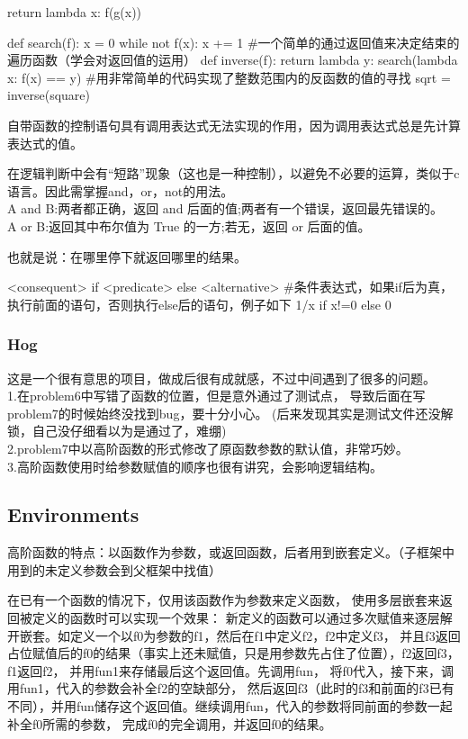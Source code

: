 \documentclass{ctexart}
\begin{document}
return lambda x: f(g(x))
\begin{python}
    def search(f):
        x = 0
        while not f(x):
            x += 1
#一个简单的通过返回值来决定结束的遍历函数（学会对返回值的运用）
    def inverse(f):
        return lambda y: search(lambda x: f(x) == y)
#用非常简单的代码实现了整数范围内的反函数的值的寻找
    sqrt = inverse(square)
\end{python}

自带函数的控制语句具有调用表达式无法实现的作用，因为调用表达式总是先计算表达式的值。

在逻辑判断中会有“短路”现象（这也是一种控制），以避免不必要的运算，类似于c语言。因此需掌握and，or，not的用法。
\\A and B:两者都正确，返回 and 后面的值;两者有一个错误，返回最先错误的。
\\A or B:返回其中布尔值为 True 的一方;若无，返回 or 后面的值。

也就是说：在哪里停下就返回哪里的结果。

\begin{python}
    <consequent> if <predicate> else <alternative>
    #条件表达式，如果if后为真，执行前面的语句，否则执行else后的语句，例子如下
    1/x if x!=0 else 0
\end{python}
\subsubsection{Hog}
这是一个很有意思的项目，做成后很有成就感，不过中间遇到了很多的问题。
\\1.在problem6中写错了函数的位置，但是意外通过了测试点，
导致后面在写problem7的时候始终没找到bug，要十分小心。
(后来发现其实是测试文件还没解锁，自己没仔细看以为是通过了，难绷)
\\2.problem7中以高阶函数的形式修改了原函数参数的默认值，非常巧妙。
\\3.高阶函数使用时给参数赋值的顺序也很有讲究，会影响逻辑结构。
\subsection{Environments}
高阶函数的特点：以函数作为参数，或返回函数，后者用到嵌套定义。（子框架中用到的未定义参数会到父框架中找值）

在已有一个函数的情况下，仅用该函数作为参数来定义函数，
使用多层嵌套来返回被定义的函数时可以实现一个效果：
新定义的函数可以通过多次赋值来逐层解开嵌套。如定义一个以f0为参数的f1，然后在f1中定义f2，f2中定义f3，
并且f3返回占位赋值后的f0的结果（事实上还未赋值，只是用参数先占住了位置），f2返回f3，f1返回f2，
并用fun1来存储最后这个返回值。先调用fun，
将f0代入，接下来，调用fun1，代入的参数会补全f2的空缺部分，
然后返回f3（此时的f3和前面的f3已有不同），并用fun储存这个返回值。继续调用fun，代入的参数将同前面的参数一起补全f0所需的参数，
完成f0的完全调用，并返回f0的结果。
\end{document}
